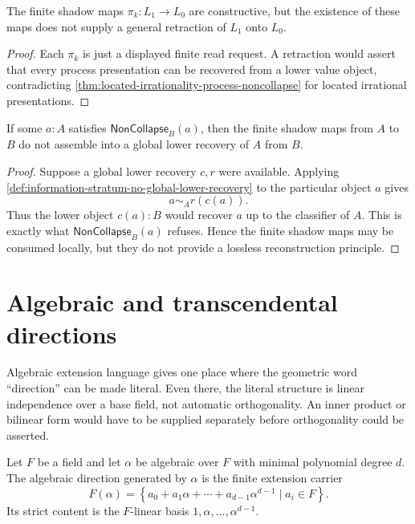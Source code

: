 \begin{corollary}
\label{cor:information-strata-projection-without-retraction}
The finite shadow maps $\pi_k:L_1\to L_0$ are constructive, but the existence
of these maps does not supply a general retraction of $L_1$ onto $L_0$.
\end{corollary}

\begin{proof}
Each $\pi_k$ is just a displayed finite read request.  A retraction would
assert that every process presentation can be recovered from a lower value
object, contradicting
\autoref{thm:located-irrationality-process-noncollapse} for located
irrational presentations.
\end{proof}

\begin{theorem}
\label{thm:local-noncollapse-forbids-global-lower-recovery}
If some $a:A$ satisfies $\mathsf{NonCollapse}_B(a)$, then the finite shadow
maps from $A$ to $B$ do not assemble into a global lower recovery of $A$ from
$B$.
\end{theorem}

\begin{proof}
Suppose a global lower recovery $c,r$ were available.  Applying
\autoref{def:information-stratum-no-global-lower-recovery} to the particular
object $a$ gives
$$
a\sim_A r(c(a)).
$$
Thus the lower object $c(a):B$ would recover $a$ up to the classifier of
$A$.  This is exactly what $\mathsf{NonCollapse}_B(a)$ refuses.  Hence the
finite shadow maps may be consumed locally, but they do not provide a
lossless reconstruction principle.
\end{proof}

\section{Algebraic and transcendental directions}
\label{sec:information-strata-algebraic-transcendental}

Algebraic extension language gives one place where the geometric word
``direction'' can be made literal.  Even there, the literal structure is
linear independence over a base field, not automatic orthogonality.  An inner
product or bilinear form would have to be supplied separately before
orthogonality could be asserted.

\begin{definition}
\label{def:finite-algebraic-direction}
Let $F$ be a field and let $\alpha$ be algebraic over $F$ with minimal
polynomial degree $d$.  The algebraic direction generated by $\alpha$ is the
finite extension carrier
$$
F(\alpha)=
\left\{
a_0+a_1\alpha+\cdots+a_{d-1}\alpha^{d-1}
\mid a_i\in F
\right\}.
$$
Its strict content is the $F$-linear basis
$1,\alpha,\ldots,\alpha^{d-1}$.
\end{definition}

